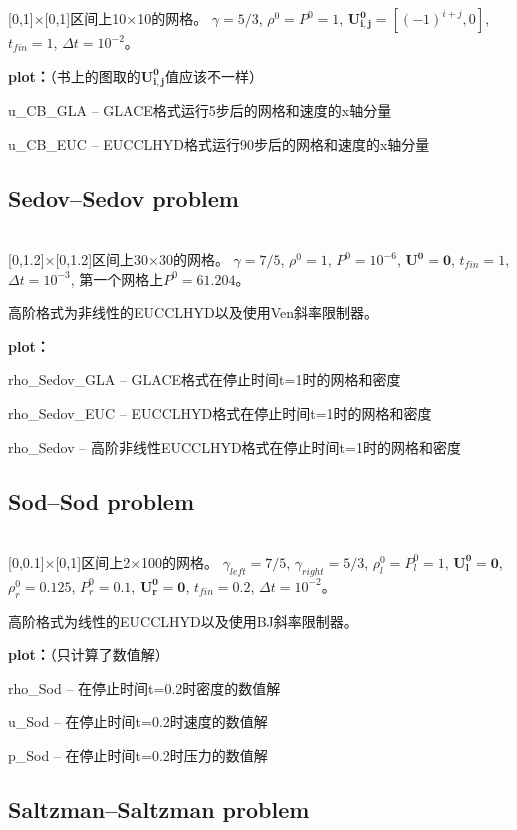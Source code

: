 \documentclass{article}
\begin{document}
[0,1]×[0,1]区间上10×10的网格。
$\gamma=5/3$, $\rho^0=P^0=1$, $\mathbf{U_{i,j}^0}=[(-1)^{i+j},0]$, $t_{fin}=1$, $\Delta t=10^{-2}$。

\textbf{plot：}（书上的图取的$\mathbf{U_{i,j}^0}$值应该不一样）

u\_CB\_GLA -- GLACE格式运行5步后的网格和速度的x轴分量

u\_CB\_EUC -- EUCCLHYD格式运行90步后的网格和速度的x轴分量


\subsection{Sedov--Sedov problem}
\ \\

[0,1.2]×[0,1.2]区间上30×30的网格。
$\gamma=7/5$, $\rho^0=1$, $P^0=10^{-6}$, $\mathbf{U^0}=\mathbf{0}$, $t_{fin}=1$, $\Delta t=10^{-3}$, 第一个网格上$P^0=61.204$。

高阶格式为非线性的EUCCLHYD以及使用Ven斜率限制器。

\textbf{plot：}

rho\_Sedov\_GLA -- GLACE格式在停止时间t=1时的网格和密度

rho\_Sedov\_EUC -- EUCCLHYD格式在停止时间t=1时的网格和密度

rho\_Sedov -- 高阶非线性EUCCLHYD格式在停止时间t=1时的网格和密度

\subsection{Sod--Sod problem}
\ \\

[0,0.1]×[0,1]区间上2×100的网格。
$\gamma_{left}=7/5$, $\gamma_{right}=5/3$, $\rho_l^0=P_l^0=1$, $\mathbf{U_l^0}=\mathbf{0}$, $\rho_r^0=0.125$, $P_r^0=0.1$, $\mathbf{U_r^0}=\mathbf{0}$, $t_{fin}=0.2$, $\Delta t=10^{-2}$。

高阶格式为线性的EUCCLHYD以及使用BJ斜率限制器。

\textbf{plot：}（只计算了数值解）

rho\_Sod -- 在停止时间t=0.2时密度的数值解

u\_Sod -- 在停止时间t=0.2时速度的数值解

p\_Sod -- 在停止时间t=0.2时压力的数值解

\subsection{Saltzman--Saltzman problem}
\ \\
\end{document}
